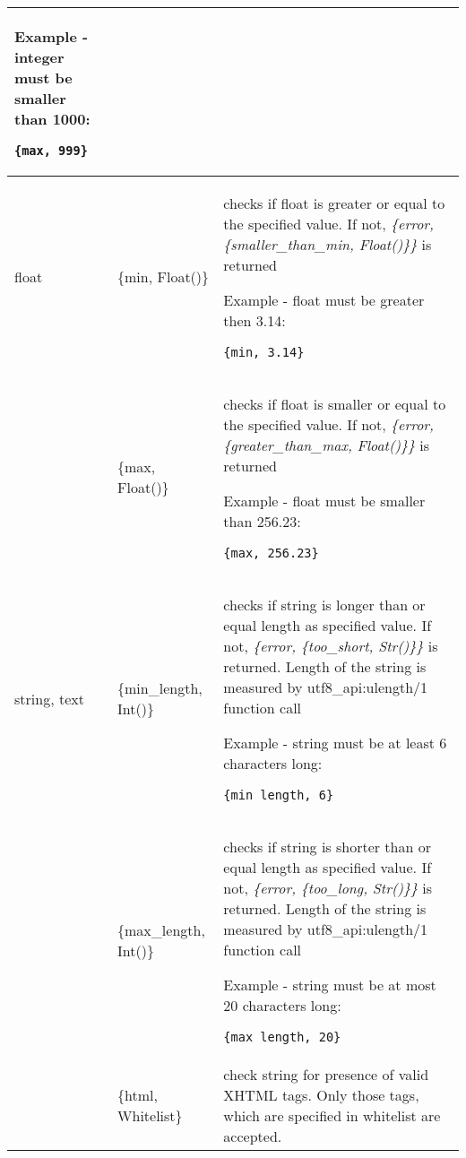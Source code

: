 \begin{longtable}{|p{}|p{}|p{}|}
Example - integer must be smaller than 1000:
\begin{verbatim}
{max, 999}
\end{verbatim}\\ 
\hline
float & \{min, Float()\} & checks if float is greater or equal to the specified value. If not, {\it \{error, \{smaller\_than\_min, Float()\}\}} is returned

Example - float must be greater then 3.14:
\begin{verbatim}
{min, 3.14}
\end{verbatim}\\
& \{max, Float()\} & checks if float is smaller or equal to the specified value. If not, {\it \{error, \{greater\_than\_max, Float()\}\}} is returned

Example - float must be smaller than 256.23:
\begin{verbatim}
{max, 256.23}
\end{verbatim}\\ 
\hline
string, text & \{min\_length, Int()\} & checks if string is longer than or equal length as specified value. If not, {\it \{error, \{too\_short, Str()\}\}} is returned. Length of the string is measured by utf8\_api:ulength/1 function call

Example - string must be at least 6 characters long:
\begin{verbatim}
{min_length, 6}
\end{verbatim}\\
& \{max\_length, Int()\} & checks if string is shorter than or equal length as specified value. If not, {\it \{error, \{too\_long, Str()\}\}} is returned. Length of the string is measured by utf8\_api:ulength/1 function call

Example - string must be at most 20 characters long:
\begin{verbatim}
{max_length, 20}
\end{verbatim}\\
\hline
& \{html, Whitelist\} & check string for presence of valid XHTML tags. Only those tags, which are specified in whitelist are accepted.


\end{longtable}
